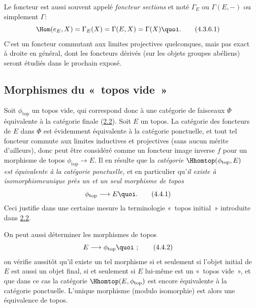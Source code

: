 \documentclass[10pt]{../fichiers-configuration-latex/smfart}
\begin{document}
\subsubsection{}
Le foncteur  est aussi souvent appelé \emph{foncteur
sections} et noté $\Gamma_E$ ou $\Gamma(E,-)$ ou simplement
$\Gamma$:
\begin{equation*}
\Hom(e_E,X)=\Gamma_E(X)=\Gamma(E,X)=\Gamma(X){\quoi}.\tag{4.3.6.1}
\end{equation*}
C'est un foncteur commutant aux limites projectives quelconques,
mais pas exact à droite en général, dont les foncteurs
dérivés (sur les objets groupes abéliens) seront étudiés
dans le prochain exposé.

\subsection{Morphismes du « topos vide »}

Soit $\phi_{\text{top}}$ un topos vide, qui correspond donc à une
catégorie de faisceaux $\Phi$ équivalente à la catégorie finale
(\hyperref[IV.subsec2.2]{2.2}). Soit $E$ un topos. La catégorie des foncteurs
de $E$ dans $\Phi$ est évidemment équivalente à la catégorie
ponctuelle, et tout tel foncteur commute aux limites inductives et
projectives (sans aucun mérite d'ailleurs), donc peut être considéré
comme un foncteur image inverse $f$ pour un morphisme de topos
$\phi_{\text{top}}\rightarrow E$. Il en résulte que la
\emph{catégorie $\Hhomtop(\phi_{\text{top}},E)$ est équivalente à la
catégorie ponctuelle,} et en particulier qu'\emph{il existe à
isomorphisme\pageoriginale unique près un et un seul morphisme de
topos}
\begin{equation*}
\phi_{\text{top}}\longrightarrow E{\quoi}.\tag{4.4.1}
\end{equation*}
Ceci justifie dans une certaine mesure la terminologie « topos
initial »  introduite dans \hyperref[IV.subsec2.2]{2.2}.

On peut aussi déterminer les morphismes de topos
\begin{equation*}
E\longrightarrow \phi_{\text{top}}{\quoi}\ ;\tag{4.4.2}
\end{equation*}
on vérifie aussitôt qu'il existe un tel morphisme si et
seulement si l'objet initial de $E$ est aussi un objet final, \ie si
et seulement si $E$ lui-même est un « topos vide », et que
dans ce cas la catégorie $\Hhomtop(E,\phi_{\text{top}})$ est
encore équivalente à la catégorie ponctuelle. L'unique
morphisme  (modulo isomorphie) est alors une
équivalence de topos.
\end{document}
